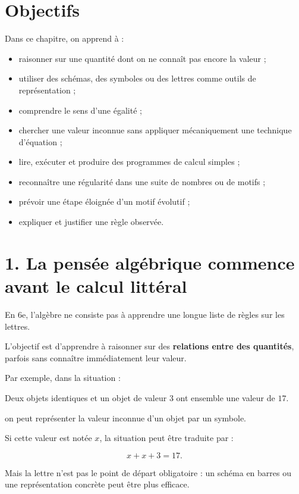 
\section{Objectifs}

Dans ce chapitre, on apprend à :

\begin{itemize}
\item raisonner sur une quantité dont on ne connaît pas encore la valeur ;
\item utiliser des schémas, des symboles ou des lettres comme outils de représentation ;
\item comprendre le sens d’une égalité ;
\item chercher une valeur inconnue sans appliquer mécaniquement une technique d’équation ;
\item lire, exécuter et produire des programmes de calcul simples ;
\item reconnaître une régularité dans une suite de nombres ou de motifs ;
\item prévoir une étape éloignée d’un motif évolutif ;
\item expliquer et justifier une règle observée.
\end{itemize}

\section{1. La pensée algébrique commence avant le calcul littéral}

En 6e, l’algèbre ne consiste pas à apprendre une longue liste de règles sur les lettres.

L’objectif est d’apprendre à raisonner sur des \textbf{relations entre des quantités}, parfois sans connaître immédiatement leur valeur.

Par exemple, dans la situation :

\begin{remarque}
Deux objets identiques et un objet de valeur $3$ ont ensemble une valeur de $17$.
\end{remarque}

on peut représenter la valeur inconnue d’un objet par un symbole.

Si cette valeur est notée $x$, la situation peut être traduite par :

\[
x+x+3=17.
\]

Mais la lettre n’est pas le point de départ obligatoire : un schéma en barres ou une représentation concrète peut être plus efficace.

